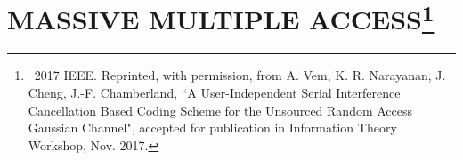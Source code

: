 \documentclass[12pt]{report}
\begin{document}
\renewcommand{\tamumanuscripttitle}{Applications of Coding Theory to Massive Multiple Access and Big Data Problems}

\renewcommand{\tamupapertype}{Dissertation}

\renewcommand{\tamufullname}{Avinash Vem}

\renewcommand{\tamudegree}{Doctor of Philosophy}
\renewcommand{\tamuchairone}{Krishna R. Narayanan}


\renewcommand{\tamumemberone}{Arun R. Srinivasa}
\newcommand{\tamumembertwo}{Jean-Francois Chamberland}
\newcommand{\tamumemberthree}{Alex Sprintson}
\renewcommand{\tamudepthead}{Miroslav M. Begovic}

\renewcommand{\tamugradmonth}{December}
\renewcommand{\tamugradyear}{2017}
\renewcommand{\tamudepartment}{Electrical Engineering}





%




%
\chapter{MASSIVE MULTIPLE ACCESS\footnote{\textcopyright ~2017 IEEE. Reprinted, with permission, from A. Vem, K. R. Narayanan, J. Cheng, J.-F. Chamberland, ``A User-Independent Serial Interference Cancellation Based Coding Scheme for the Unsourced Random Access Gaussian Channel", accepted for publication in Information Theory Workshop, Nov. 2017.}}
\label{chap:MAC}

\end{document}
